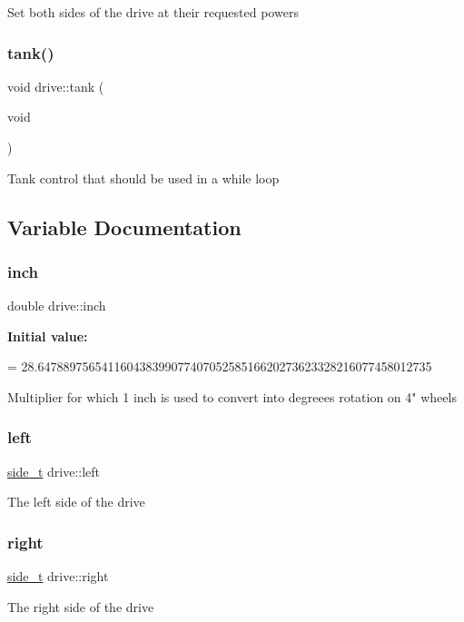 Set both sides of the drive at their requested powers \mbox{\label{namespacedrive_a4468fd8982ce72051c07b37cf1f91185}} 
\subsubsection{\texorpdfstring{tank()}{tank()}}
{\footnotesize\ttfamily void drive\+::tank (\begin{DoxyParamCaption}\item[{void}]{ }\end{DoxyParamCaption})}

Tank control that should be used in a while loop 

\subsection{Variable Documentation}
\mbox{\label{namespacedrive_ac57641567511fcbc0ce6bf72b1aff76e}} 
\subsubsection{\texorpdfstring{inch}{inch}}
{\footnotesize\ttfamily double drive\+::inch}

{\bfseries Initial value\+:}
\begin{DoxyCode}
=
      28.64788975654116043839907740705258516620273623328216077458012735
\end{DoxyCode}
Multiplier for which 1 inch is used to convert into degreees rotation on 4" wheels \mbox{\label{namespacedrive_abde1df4410c0d0bfc462f3fb33ab9c5d}} 
\subsubsection{\texorpdfstring{left}{left}}
{\footnotesize\ttfamily \hyperlink{structdrive_1_1side__t}{side\+\_\+t} drive\+::left}

The left side of the drive \mbox{\label{namespacedrive_a6adcb98f34f373f5e1fae1c46b8d7269}} 
\subsubsection{\texorpdfstring{right}{right}}
{\footnotesize\ttfamily \hyperlink{structdrive_1_1side__t}{side\+\_\+t} drive\+::right}

The right side of the drive 